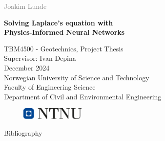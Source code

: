\documentclass[a4paper, 12pt,oneside]{book}
\begin{document}
\begin{titlepage}
  \vspace*{1.5cm}

  \noindent  \textcolor{gray}{\large Joakim Lunde} \\
  \vspace{1cm}

  \noindent \textbf{\LARGE Solving Laplace's equation with\\ Physics-Informed Neural Networks \\}
  \vspace{1cm}

  \noindent TBM4500 - Geotechnics, Project Thesis \\
  Supervisor: Ivan Depina \\
  December 2024 \\

  \vspace{9cm}
  \noindent
  Norwegian University of Science and Technology \\
  Faculty of Engineering Science \\
  Department of Civil and Environmental Engineering \\
  \vspace{0.8cm}

  \begin{figure}[h]
    \includegraphics[width=0.28\textwidth]{Figures/ntnu_basic.png}
  \end{figure}
\end{titlepage}






\tableofcontents
{}


\listoffigures
{}

\listoftables
{}




% 
% 
% 
% 
% 


{\protect\numberline{}Bibliography}
\chapter*{\bibname}
\printbibliography[heading=none]
\cleardoublepage

% 
\end{document}
